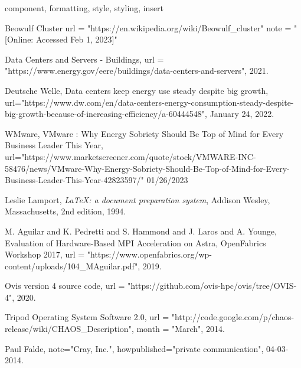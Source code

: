 \documentclass[conference]{IEEEtran}
\begin{document}
\begin{IEEEkeywords}
component, formatting, style, styling, insert
\end{IEEEkeywords}







%

\begin{thebibliography}{10}

  Beowulf Cluster
  url = "https://en.wikipedia.org/wiki/Beowulf_cluster"
  note = "[Online: Accessed Feb 1, 2023]"

  Data Centers and Servers - Buildings,
  url = "https://www.energy.gov/eere/buildings/data-centers-and-servers",
  2021.
  
  Deutsche Welle,
  Data centers keep energy use steady despite big growth,
  url="https://www.dw.com/en/data-centers-energy-consumption-steady-despite-big-growth-because-of-increasing-efficiency/a-60444548",
  January 24, 2022.
  
  WMware,
  VMware : Why Energy Sobriety Should Be Top of Mind for Every Business Leader This Year,
  url="https://www.marketscreener.com/quote/stock/VMWARE-INC-58476/news/VMware-Why-Energy-Sobriety-Should-Be-Top-of-Mind-for-Every-Business-Leader-This-Year-42823597/"
  01/26/2023
  
  
  Leslie Lamport,
  \textit{\LaTeX: a document preparation system},
  Addison Wesley, Massachusetts, 
  2nd edition,
  1994.

  M. Aguilar and K. Pedretti and S. Hammond and J. Laros and A. Younge,
  {E}valuation of {H}ardware-{B}ased {MPI} {A}cceleration on {A}stra,
  {O}pen{F}abrics {W}orkshop 2017,
  url = "https://www.openfabrics.org/wp-content/uploads/104{\_}MAguilar.pdf",
  2019.

  {O}vis version 4 source code,
  url = "https://github.com/ovis-hpc/ovis/tree/OVIS-4",
  2020.

  {T}ripod {O}perating {S}ystem {S}oftware 2.0,
  url = "http://code.google.com/p/chaos-release/wiki/CHAOS_Description",
  month = "March",
  2014.

  Paul Falde,
  note="{Cray, Inc.}",
  howpublished="private communication",
  04-03-2014.


\end{thebibliography}
\end{document}
